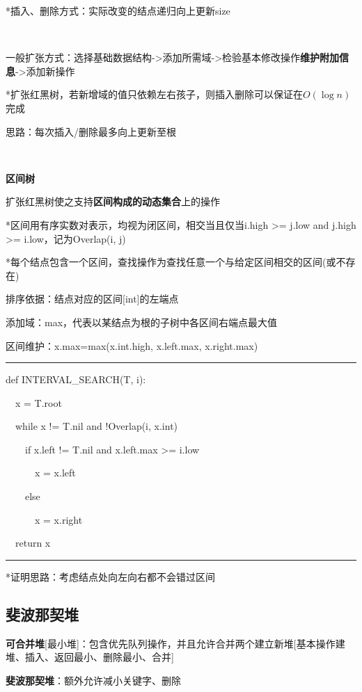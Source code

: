 \documentclass[a4paper,UTF8,fontset=windows]{ctexart}
\newenvironment{code}{\rule{36em}{0.1em}\setlength{\parindent}{1em}

}{

\setlength{\parindent}{0em}\rule{36em}{0.1em}}
\begin{document}
*\hspace{0em}插入、删除方式：实际改变的结点递归向上更新size

\

一般扩张方式：选择基础数据结构->添加所需域->检验基本修改操作\textbf{维护附加信息}->添加新操作

*\hspace{0em}扩张红黑树，若新增域的值只依赖左右孩子，则插入删除可以保证在$O(\log n)$完成

思路：每次插入/删除最多向上更新至根

\

\textbf{区间树}

扩张红黑树使之支持\textbf{区间构成的动态集合}上的操作

*\hspace{0em}区间用有序实数对表示，均视为闭区间，相交当且仅当i.high >= j.low and j.high >= i.low，记为Overlap(i, j)

*\hspace{0em}每个结点包含一个区间，查找操作为查找任意一个与给定区间相交的区间(或不存在)

排序依据：结点对应的区间[int]的左端点

添加域：max，代表以某结点为根的子树中各区间右端点最大值

区间维护：x.max=max(x.int.high, x.left.max, x.right.max)

\begin{code}
def INTERVAL\_SEARCH(T, i):

\ \ x = T.root

\ \ while x != T.nil and !Overlap(i, x.int)

\ \ \ \ if x.left != T.nil and x.left.max >= i.low

\ \ \ \ \ \ x = x.left

\ \ \ \ else

\ \ \ \ \ \ x = x.right

\ \ return x
\end{code}

*\hspace{0em}证明思路：考虑结点处向左向右都不会错过区间

\subsection{斐波那契堆}

\textbf{可合并堆}[最小堆]：包含优先队列操作，并且允许合并两个建立新堆[基本操作建堆、插入、返回最小、删除最小、合并]

\textbf{斐波那契堆}：额外允许减小关键字、删除
\end{document}
